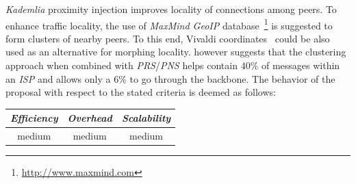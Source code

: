 
\emph{Kademlia} proximity injection improves 
locality of connections among peers.
To enhance traffic locality, the use of 
{\sl MaxMind GeoIP} database~\footnote{\url{http://www.maxmind.com}} 
is suggested to form clusters of nearby peers.
To this end, Vivaldi coordinates~\cite{cox_vivaldi_2004} could be 
also used as an alternative for morphing locality. 
\cite{KLKP2008} however suggests that the clustering approach 
when combined with \emph{PRS}/\emph{PNS} helps contain 
$40\%$ of messages within an \emph{ISP} and allows only a $6\%$ 
to go through the backbone.
The behavior of the proposal with respect to the stated criteria is deemed as follows:
\begin{center}
{\footnotesize
\begin{tabular}{ccc}
\emph{Efficiency} & \emph{Overhead} & \emph{Scalability} \\
\hline
medium &
% 
medium &
medium
\end{tabular}
}
\end{center}



